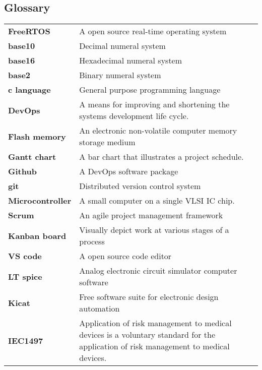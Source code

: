\documentclass[../report.tex]{subfiles}
\begin{document}
\subsection{Glossary}
\begin{table}[H]
    \begin{center}
        \begin{tabularx}{\linewidth}{l L}
            \textbf{FreeRTOS} & A open source real-time operating system \\
            \textbf{base10} & Decimal numeral system \\
            \textbf{base16} & Hexadecimal numeral system \\
            \textbf{base2} & Binary numeral system \\
            \textbf{c language} & General purpose programming language \\
            \textbf{DevOps} & A means for improving and shortening the systems development life cycle. \\
            \textbf{Flash memory} & An electronic non-volatile computer memory storage medium \\
            \textbf{Gantt chart} & A bar chart that illustrates a project schedule. \\
            \textbf{Github} & A DevOps software package \\
            \textbf{git} & Distributed version control system \\
            \textbf{Microcontroller} & A small computer on a single VLSI IC chip. \\
            \textbf{Scrum} & An agile project management framework \\
            \textbf{Kanban board} & Visually depict work at various stages of a
            process\\
            \textbf{VS code} & A open source code editor\\
            \textbf{LT spice} & Analog electronic circuit simulator computer software\\
            \textbf{Kicat}& Free software suite for electronic design
            automation\\
            \textbf{IEC1497} & Application of risk management to medical devices is a voluntary standard for the application of risk management to medical devices.  \\
        \end{tabularx}
    \end{center}
\end{table}
\end{document}
